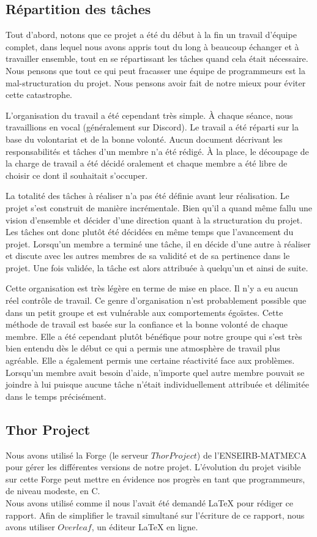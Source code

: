 \documentclass{article}
\begin{document}
    \subsection{Répartition des tâches}
    Tout d'abord, notons que ce projet a été du début à la fin un travail d'équipe complet, dans lequel nous avons appris tout du long à beaucoup échanger et à travailler ensemble, tout en se répartissant les tâches quand cela était nécessaire. Nous pensons que tout ce qui peut fracasser une équipe de programmeurs est la mal-structuration du projet. Nous pensons avoir fait de notre mieux pour éviter cette catastrophe.
    
    L'organisation du travail a été cependant très simple. \`A chaque séance, nous travaillions en vocal (généralement sur Discord). Le travail a été réparti sur la base du volontariat et de la bonne volonté. Aucun document décrivant les responsabilités et tâches d'un membre n'a été rédigé. \`A la place, le découpage de la charge de travail a été décidé oralement et chaque membre a été libre de choisir ce dont il souhaitait s'occuper.
    
    La totalité des tâches à réaliser n'a pas été définie avant leur réalisation. Le projet s'est construit de manière incrémentale. Bien qu'il a quand même fallu une vision d'ensemble et décider d'une direction quant à la structuration du projet. Les tâches ont donc plutôt été décidées en même temps que l'avancement du projet. Lorsqu'un membre a terminé une tâche, il en décide d'une autre à réaliser et discute avec les autres membres de sa validité et de sa pertinence dans le projet. Une fois validée, la tâche est alors attribuée à quelqu'un et ainsi de suite.
    
    Cette organisation est très légère en terme de mise en place. Il n'y a eu aucun réel contrôle de travail. Ce genre d'organisation n'est probablement possible que dans un petit groupe et est vulnérable aux comportements égoïstes. Cette méthode de travail est basée sur la confiance et la bonne volonté de chaque membre. Elle a été cependant plutôt bénéfique pour notre groupe qui s'est très bien entendu dès le début ce qui a permis une atmosphère de travail plus agréable. Elle a également permis une certaine réactivité face aux problèmes. Lorsqu'un membre avait besoin d'aide, n'importe quel autre membre pouvait se joindre à lui puisque aucune tâche n'était individuellement attribuée et délimitée dans le temps précisément.
    
    \subsection{Thor Project}
    Nous avons utilisé la Forge (le serveur $Thor Project$) de l'ENSEIRB-MATMECA pour gérer les différentes versions de notre projet. L'évolution du projet visible sur cette Forge peut mettre en évidence nos progrès en tant que programmeurs, de niveau modeste, en C.\\
    Nous avons utilisé comme il nous l'avait été demandé LaTeX pour rédiger ce rapport. Afin de simplifier le travail simultané sur l'écriture de ce rapport, nous avons utiliser $Overleaf$, un éditeur LaTeX en ligne.\\
\end{document}
